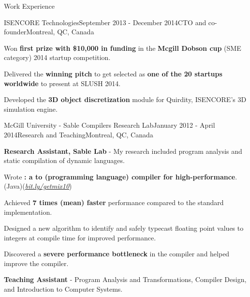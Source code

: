 \documentclass{resume} %
\begin{document}
\begin{rSection}{Work Experience}
\begin{rSubsection}{ISENCORE Technologies}{September 2013 - December 2014}{CTO
        and co-founder}{Montreal, QC, Canada}
\item Won \textbf{first prize with \$10,000 in funding} in the \textbf{Mcgill
        Dobson cup} (SME category) 2014 startup competition. 
\item Delivered the \textbf{winning pitch} to get selected as \textbf{one of
        the 20 startups worldwide} to present at SLUSH 2014.
\item Developed the \textbf{3D object discretization} module for
        Quirdity, ISENCORE's 3D simulation engine. 
\end{rSubsection}

\begin{rSubsection}{McGill University - Sable Compilers Research Lab}{January
        2012 - April 2014}{Research and Teaching}{Montreal, QC, Canada} 
\item \textbf{Research Assistant, Sable Lab} - My research included program
        analysis and static compilation of dynamic languages.

\begin{lsubSubsection}
\item Wrote \textbf{\mixtenx: a \matlab to \xten (programming language) compiler for
        high-performance}. (Java)(\href{http://bit.ly/getmix10}{\em{bit.ly/getmix10}})  
\item Achieved \textbf{7 times (mean) faster} performance compared to the
        standard \matlab implementation.
\item Designed a new algorithm to identify and safely typecast
        floating point values to integers at compile time for improved
        performance.
\item Discovered a \textbf{severe performance bottleneck} in the \xten compiler
        and helped improve the \xten compiler.  
\end{lsubSubsection}
\item \textbf{Teaching Assistant} - Program Analysis and Transformations,
	Compiler Design, and Introduction to Computer Systems.
\end{rSubsection}


\end{rSection}
\end{document}
